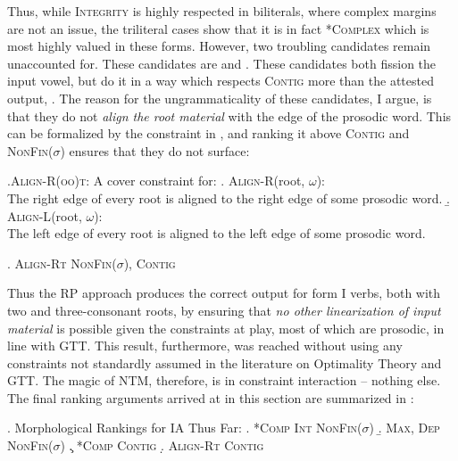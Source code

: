 \documentclass[12pt,twoside,letterpaper]{article}
\begin{document}
Thus, while \textsc{Integrity} is highly respected in biliterals, where complex margins are not an issue, the triliteral cases show that it is in fact *\textsc{Complex} which is most highly valued in these forms. However, two troubling candidates remain unaccounted for. These candidates are {\em {}}  and {\em {}}. These candidates both fission the input vowel, but do it in a way which respects \textsc{Contig} more than the attested output, {\em {}}. The reason for the ungrammaticality of these candidates, I argue, is that they do not \emph{align the root material} with the edge of the prosodic word. This can be formalized by the constraint in \Next, and ranking it above \textsc{Contig} and \textsc{NonFin}($\sigma$) ensures that they do not surface:

\pagebreak

\ex.\label{ex:align-root}\textsc{Align-R(oo)t}: A cover constraint for:
\a. \label{ex:align-rootR}\textsc{Align-R}(root, $\omega$):\\The right edge of every root is aligned to the right edge of some prosodic word.
\b. \label{ex:align-rootL}\textsc{Align-L}(root, $\omega$):\\The left edge of every root is aligned to the left edge of some prosodic word.


\ex. \textsc{Align-Rt} \OTdom \textsc{NonFin}($\sigma$), \textsc{Contig}\\\begin{OTtableau}{2}
\end{OTtableau}

Thus the RP approach produces the correct output for form I verbs, both with two and three-consonant roots, by ensuring that \emph{no other linearization of input material} is possible given the constraints at play, most of which are prosodic, in line with GTT. This result, furthermore, was reached without using any constraints not standardly assumed in the literature on Optimality Theory and GTT. The magic of NTM, therefore, is in constraint interaction -- nothing else. The final ranking arguments arrived at in this section are summarized in \Next:


\ex. Morphological Rankings for IA Thus Far:
\a. \textsc{*Comp} \OTdom \textsc{Int} \OTdom \textsc{NonFin}($\sigma$)
\b. \textsc{Max}, \textsc{Dep}  \OTdom \textsc{NonFin}($\sigma$)
\c. \textsc{*Comp} \OTdom \textsc{Contig}
\d. \textsc{Align-Rt} \OTdom \textsc{Contig}
\end{document}
